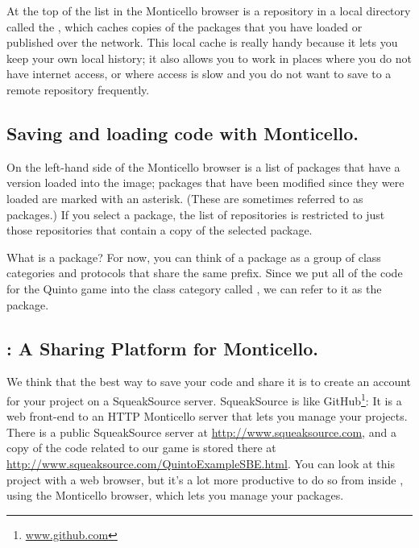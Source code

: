 \documentclass[a4paper,10pt,twoside]{book}
\begin{document}
At the top of the list in the Monticello browser is a repository in a local directory called the , which caches copies of the packages that you have loaded or published over the network.
This local cache is really handy because it lets you keep your own local history; it also allows you to work in places where you do not have internet access, or where access is slow and you do not want to save to a remote repository frequently.


\subsection{Saving and loading code with Monticello.}
On the left-hand side of the Monticello browser is a list of packages that have a version loaded into the image; packages that have been modified since they were loaded are marked with an asterisk.
(These are sometimes referred to as  packages.)
If you select a package, the list of repositories is restricted to just those repositories that contain a copy of the selected package.

What is a package?
For now, you can think of a package as a group of class categories and protocols that share the same prefix.
Since we put all of the code for the Quinto game into the class category called , we can refer to it as the  package.


\subsection{: A Sharing Platform for Monticello.} 
We think that the best way to save your code and share it is to create an account for your project on a SqueakSource server. 
SqueakSource is like GitHub\footnote{\url{www.github.com}}:
It is a web front-end to an HTTP Monticello server that lets you manage your projects.
There is a public SqueakSource server at \url{http://www.squeaksource.com}, and a copy of the code related to our game is stored there at \url{http://www.squeaksource.com/QuintoExampleSBE.html}.
You can look at this project with a web browser, but it's a lot more productive to do so from inside \squeak, using the Monticello browser, which lets you manage your packages.
\end{document}
